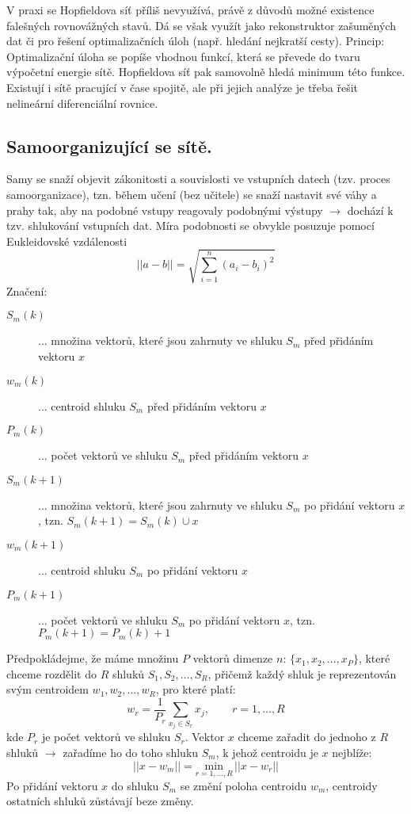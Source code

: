 V praxi se Hopfieldova síť příliš nevyužívá, právě z důvodů možné existence falešných rovnovážných stavů. Dá se však využít jako rekonstruktor zašuměných dat či pro řešení optimalizačních úloh (např. hledání nejkratší cesty). Princip: Optimalizační úloha se popíše vhodnou funkcí, která se převede do tvaru výpočetní energie sítě. Hopfieldova síť pak samovolně hledá minimum této funkce. Existují i sítě pracující v čase spojitě, ale při jejich analýze je třeba řešit nelineární diferenciální rovnice.

\subsection{Samoorganizující se sítě.}
Samy se snaží objevit zákonitosti a souvislosti ve vstupních datech (tzv. proces samoorganizace), tzn. během učení (bez učitele) se snaží nastavit své váhy a prahy tak, aby na podobné vstupy reagovaly podobnými výstupy $ \to $ dochází k tzv. shlukování vstupních dat. Míra podobnosti se obvykle posuzuje pomocí Eukleidovské vzdálenosti
\begin{equation}
||a-b|| = \sqrt{\displaystyle{\sum_{i=1}^n} (a_i-b_i)^2}
\end{equation}
Značení:
\begin{description}
\item[$ S_m(k) $] ... množina vektorů, které jsou zahrnuty ve shluku $ S_m $ před přidáním vektoru $ x $
\item[$ w_m(k) $] ... centroid shluku $ S_m $ před přidáním vektoru $ x $
\item[$ P_m(k) $] ... počet vektorů ve shluku $ S_m $ před přidáním vektoru $ x $
\item[$ S_m(k+1) $] ... množina vektorů, které jsou zahrnuty ve shluku $ S_m $ po přidání vektoru $ x $, tzn. $ S_m(k+1) = S_m(k) \cup x $
\item[$ w_m(k+1) $] ... centroid shluku $ S_m $ po přidání vektoru $ x $
\item[$ P_m(k+1) $] ... počet vektorů ve shluku $ S_m $ po přidání vektoru $ x $, tzn. $ P_m(k+1) = P_m(k) + 1 $
\end{description}
Předpokládejme, že máme množinu $ P $ vektorů dimenze $ n $: $ \{x_1, x_2, ..., x_P\} $, které chceme rozdělit do $ R $ shluků $ S_1, S_2, ..., S_R $, přičemž každý shluk je reprezentován svým centroidem $ w_1, w_2, ..., w_R $, pro které platí:
\begin{equation}
w_r = \frac{1}{P_r} \displaystyle{\sum_{x_j \in S_r}} x_j, \qquad r=1,...,R
\end{equation}
kde $ P_r $ je počet vektorů ve shluku $ S_r $. Vektor $ x $ chceme zařadit do jednoho z $ R $ shluků $ \to $ zařadíme ho do toho shluku $ S_m $, k jehož centroidu je $ x $ nejblíže:
\begin{equation}
||x-w_m|| = \underset{r=1,...,R}{\mathrm{min}} \, ||x-w_r||
\end{equation}
Po přidání vektoru $ x $ do shluku $ S_m $ se změní poloha centroidu $ w_m $, centroidy ostatních shluků zůstávají beze změny.

